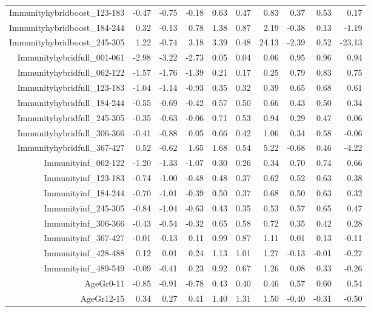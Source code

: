 \begin{table}[ht]
\begin{tabular}{rrrrrrrrrr}
  Immunityhybridboost\_123-183 & -0.47 & -0.75 & -0.18 & 0.63 & 0.47 & 0.83 & 0.37 & 0.53 & 0.17 \\ 
  Immunityhybridboost\_184-244 & 0.32 & -0.13 & 0.78 & 1.38 & 0.87 & 2.19 & -0.38 & 0.13 & -1.19 \\ 
  Immunityhybridboost\_245-305 & 1.22 & -0.74 & 3.18 & 3.39 & 0.48 & 24.13 & -2.39 & 0.52 & -23.13 \\ 
  Immunityhybridfull\_001-061 & -2.98 & -3.22 & -2.73 & 0.05 & 0.04 & 0.06 & 0.95 & 0.96 & 0.94 \\ 
  Immunityhybridfull\_062-122 & -1.57 & -1.76 & -1.39 & 0.21 & 0.17 & 0.25 & 0.79 & 0.83 & 0.75 \\ 
  Immunityhybridfull\_123-183 & -1.04 & -1.14 & -0.93 & 0.35 & 0.32 & 0.39 & 0.65 & 0.68 & 0.61 \\ 
  Immunityhybridfull\_184-244 & -0.55 & -0.69 & -0.42 & 0.57 & 0.50 & 0.66 & 0.43 & 0.50 & 0.34 \\ 
  Immunityhybridfull\_245-305 & -0.35 & -0.63 & -0.06 & 0.71 & 0.53 & 0.94 & 0.29 & 0.47 & 0.06 \\ 
  Immunityhybridfull\_306-366 & -0.41 & -0.88 & 0.05 & 0.66 & 0.42 & 1.06 & 0.34 & 0.58 & -0.06 \\ 
  Immunityhybridfull\_367-427 & 0.52 & -0.62 & 1.65 & 1.68 & 0.54 & 5.22 & -0.68 & 0.46 & -4.22 \\ 
  Immunityinf\_062-122 & -1.20 & -1.33 & -1.07 & 0.30 & 0.26 & 0.34 & 0.70 & 0.74 & 0.66 \\ 
  Immunityinf\_123-183 & -0.74 & -1.00 & -0.48 & 0.48 & 0.37 & 0.62 & 0.52 & 0.63 & 0.38 \\ 
  Immunityinf\_184-244 & -0.70 & -1.01 & -0.39 & 0.50 & 0.37 & 0.68 & 0.50 & 0.63 & 0.32 \\ 
  Immunityinf\_245-305 & -0.84 & -1.04 & -0.63 & 0.43 & 0.35 & 0.53 & 0.57 & 0.65 & 0.47 \\ 
  Immunityinf\_306-366 & -0.43 & -0.54 & -0.32 & 0.65 & 0.58 & 0.72 & 0.35 & 0.42 & 0.28 \\ 
  Immunityinf\_367-427 & -0.01 & -0.13 & 0.11 & 0.99 & 0.87 & 1.11 & 0.01 & 0.13 & -0.11 \\ 
  Immunityinf\_428-488 & 0.12 & 0.01 & 0.24 & 1.13 & 1.01 & 1.27 & -0.13 & -0.01 & -0.27 \\ 
  Immunityinf\_489-549 & -0.09 & -0.41 & 0.23 & 0.92 & 0.67 & 1.26 & 0.08 & 0.33 & -0.26 \\ 
  AgeGr0-11 & -0.85 & -0.91 & -0.78 & 0.43 & 0.40 & 0.46 & 0.57 & 0.60 & 0.54 \\ 
  AgeGr12-15 & 0.34 & 0.27 & 0.41 & 1.40 & 1.31 & 1.50 & -0.40 & -0.31 & -0.50 \\ 

\end{tabular}
\end{table}
